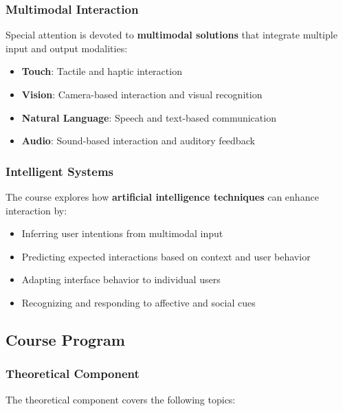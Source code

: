 \documentclass[11pt,a4paper]{article}
\theoremstyle{definition}
\theoremstyle{plain}
\theoremstyle{remark}
\begin{document}
\subsubsection{Multimodal Interaction}

Special attention is devoted to \textbf{multimodal solutions} that integrate multiple input and output modalities:
\begin{itemize}
    \item \textbf{Touch}: Tactile and haptic interaction
    \item \textbf{Vision}: Camera-based interaction and visual recognition
    \item \textbf{Natural Language}: Speech and text-based communication
    \item \textbf{Audio}: Sound-based interaction and auditory feedback
\end{itemize}

\subsubsection{Intelligent Systems}

The course explores how \textbf{artificial intelligence techniques} can enhance interaction by:
\begin{itemize}
    \item Inferring user intentions from multimodal input
    \item Predicting expected interactions based on context and user behavior
    \item Adapting interface behavior to individual users
    \item Recognizing and responding to affective and social cues
\end{itemize}

\subsection{Course Program}

\subsubsection{Theoretical Component}

The theoretical component covers the following topics:
\end{document}
